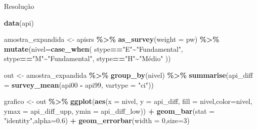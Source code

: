 \documentclass[
  9pt,
  ignorenonframetext,
]{beamer}
\newenvironment{Shaded}{\begin{snugshade}}{\end{snugshade}}
\newcommand{\DataTypeTok}[1]{\textcolor[rgb]{0.13,0.29,0.53}{#1}}
\newcommand{\DecValTok}[1]{\textcolor[rgb]{0.00,0.00,0.81}{#1}}
\newcommand{\FloatTok}[1]{\textcolor[rgb]{0.00,0.00,0.81}{#1}}
\newcommand{\KeywordTok}[1]{\textcolor[rgb]{0.13,0.29,0.53}{\textbf{#1}}}
\newcommand{\NormalTok}[1]{#1}
\newcommand{\OperatorTok}[1]{\textcolor[rgb]{0.81,0.36,0.00}{\textbf{#1}}}
\newcommand{\StringTok}[1]{\textcolor[rgb]{0.31,0.60,0.02}{#1}}
\begin{document}
\begin{frame}[fragile]{Resolução}
\protect\hypertarget{resoluuxe7uxe3o}{}
\begin{Shaded}
\begin{Highlighting}[]
\KeywordTok{data}\NormalTok{(api)}

\NormalTok{amostra\_expandida \textless{}{-}}\StringTok{ }\NormalTok{apisrs }\OperatorTok{\%\textgreater{}\%}\StringTok{ }
\StringTok{  }\KeywordTok{as\_survey}\NormalTok{(}\DataTypeTok{weight =}\NormalTok{ pw) }\OperatorTok{\%\textgreater{}\%}
\StringTok{  }\KeywordTok{mutate}\NormalTok{(}\DataTypeTok{nivel=}\KeywordTok{case\_when}\NormalTok{(}
\NormalTok{    stype}\OperatorTok{==}\StringTok{"E"}\OperatorTok{\textasciitilde{}}\StringTok{"Fundamental"}\NormalTok{,}
\NormalTok{    stype}\OperatorTok{==}\StringTok{"M"}\OperatorTok{\textasciitilde{}}\StringTok{"Fundamental"}\NormalTok{,}
\NormalTok{    stype}\OperatorTok{==}\StringTok{"H"}\OperatorTok{\textasciitilde{}}\StringTok{"Médio"}
\NormalTok{  ))}
\end{Highlighting}
\end{Shaded}
\end{frame}

\begin{frame}[fragile]{}
\protect\hypertarget{section-5}{}
\begin{Shaded}
\begin{Highlighting}[]
\NormalTok{out \textless{}{-}}\StringTok{ }\NormalTok{amostra\_expandida }\OperatorTok{\%\textgreater{}\%}
\StringTok{  }\KeywordTok{group\_by}\NormalTok{(nivel) }\OperatorTok{\%\textgreater{}\%}
\StringTok{  }\KeywordTok{summarise}\NormalTok{(}\DataTypeTok{api\_diff =} 
              \KeywordTok{survey\_mean}\NormalTok{(api00 }\OperatorTok{{-}}\StringTok{ }\NormalTok{api99, }\DataTypeTok{vartype =} \StringTok{"ci"}\NormalTok{))}
\end{Highlighting}
\end{Shaded}
\end{frame}

\begin{frame}[fragile]{}
\protect\hypertarget{section-6}{}
\begin{Shaded}
\begin{Highlighting}[]
\NormalTok{grafico \textless{}{-}}\StringTok{ }\NormalTok{out }\OperatorTok{\%\textgreater{}\%}\StringTok{ }
\StringTok{  }\KeywordTok{ggplot}\NormalTok{(}\KeywordTok{aes}\NormalTok{(}\DataTypeTok{x =}\NormalTok{ nivel, }\DataTypeTok{y =}\NormalTok{ api\_diff, }
             \DataTypeTok{fill =}\NormalTok{ nivel,}\DataTypeTok{color=}\NormalTok{nivel,}
                       \DataTypeTok{ymax =}\NormalTok{ api\_diff\_upp, }
             \DataTypeTok{ymin =}\NormalTok{ api\_diff\_low)) }\OperatorTok{+}
\StringTok{  }\KeywordTok{geom\_bar}\NormalTok{(}\DataTypeTok{stat =} \StringTok{"identity"}\NormalTok{,}\DataTypeTok{alpha=}\FloatTok{0.6}\NormalTok{) }\OperatorTok{+}
\StringTok{  }\KeywordTok{geom\_errorbar}\NormalTok{(}\DataTypeTok{width =} \DecValTok{0}\NormalTok{,}\DataTypeTok{size=}\DecValTok{3}\NormalTok{) }
\end{Highlighting}
\end{Shaded}
\end{frame}
\end{document}
